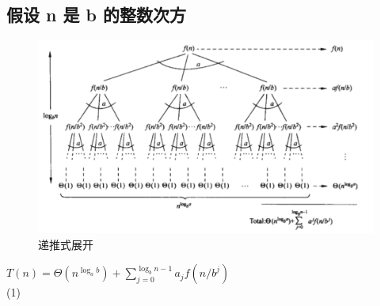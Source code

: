 \subsection{假设 n 是 b 的整数次方}
\begin{figure}[htb]
  \centering
  \includegraphics[scale=0.5]{image/mainmaster.png}
  \caption{递推式展开}\label{fig:nearestpoints-divide}
\end{figure}
$T(n)=\Theta\left(n^{\log _{a} b}\right)+\sum_{j=0}^{\log _{b} n-1} a_{j} f\left(n / b^{j}\right)$\\
(1)
